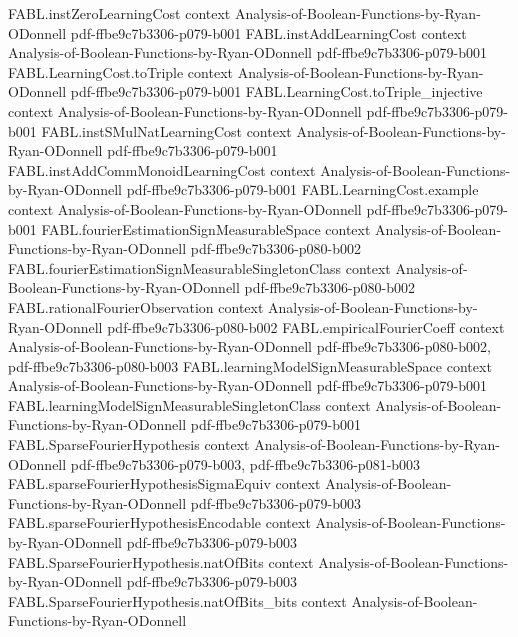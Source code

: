 \begin{theorem}
  {FABL.instZeroLearningCost}
  {context}
  {Analysis-of-Boolean-Functions-by-Ryan-ODonnell}
  {pdf-ffbe9c7b3306-p079-b001}
\proofstep
  {FABL.instAddLearningCost}
  {context}
  {Analysis-of-Boolean-Functions-by-Ryan-ODonnell}
  {pdf-ffbe9c7b3306-p079-b001}
\proofstep
  {FABL.LearningCost.toTriple}
  {context}
  {Analysis-of-Boolean-Functions-by-Ryan-ODonnell}
  {pdf-ffbe9c7b3306-p079-b001}
\proofstep
  {FABL.LearningCost.toTriple_injective}
  {context}
  {Analysis-of-Boolean-Functions-by-Ryan-ODonnell}
  {pdf-ffbe9c7b3306-p079-b001}
\proofstep
  {FABL.instSMulNatLearningCost}
  {context}
  {Analysis-of-Boolean-Functions-by-Ryan-ODonnell}
  {pdf-ffbe9c7b3306-p079-b001}
\proofstep
  {FABL.instAddCommMonoidLearningCost}
  {context}
  {Analysis-of-Boolean-Functions-by-Ryan-ODonnell}
  {pdf-ffbe9c7b3306-p079-b001}
\proofstep
  {FABL.LearningCost.example}
  {context}
  {Analysis-of-Boolean-Functions-by-Ryan-ODonnell}
  {pdf-ffbe9c7b3306-p079-b001}
\proofstep
  {FABL.fourierEstimationSignMeasurableSpace}
  {context}
  {Analysis-of-Boolean-Functions-by-Ryan-ODonnell}
  {pdf-ffbe9c7b3306-p080-b002}
\proofstep
  {FABL.fourierEstimationSignMeasurableSingletonClass}
  {context}
  {Analysis-of-Boolean-Functions-by-Ryan-ODonnell}
  {pdf-ffbe9c7b3306-p080-b002}
\proofstep
  {FABL.rationalFourierObservation}
  {context}
  {Analysis-of-Boolean-Functions-by-Ryan-ODonnell}
  {pdf-ffbe9c7b3306-p080-b002}
\proofstep
  {FABL.empiricalFourierCoeff}
  {context}
  {Analysis-of-Boolean-Functions-by-Ryan-ODonnell}
  {pdf-ffbe9c7b3306-p080-b002,
    pdf-ffbe9c7b3306-p080-b003}
\proofstep
  {FABL.learningModelSignMeasurableSpace}
  {context}
  {Analysis-of-Boolean-Functions-by-Ryan-ODonnell}
  {pdf-ffbe9c7b3306-p079-b001}
\proofstep
  {FABL.learningModelSignMeasurableSingletonClass}
  {context}
  {Analysis-of-Boolean-Functions-by-Ryan-ODonnell}
  {pdf-ffbe9c7b3306-p079-b001}
\proofstep
  {FABL.SparseFourierHypothesis}
  {context}
  {Analysis-of-Boolean-Functions-by-Ryan-ODonnell}
  {pdf-ffbe9c7b3306-p079-b003,
    pdf-ffbe9c7b3306-p081-b003}
\proofstep
  {FABL.sparseFourierHypothesisSigmaEquiv}
  {context}
  {Analysis-of-Boolean-Functions-by-Ryan-ODonnell}
  {pdf-ffbe9c7b3306-p079-b003}
\proofstep
  {FABL.sparseFourierHypothesisEncodable}
  {context}
  {Analysis-of-Boolean-Functions-by-Ryan-ODonnell}
  {pdf-ffbe9c7b3306-p079-b003}
\proofstep
  {FABL.SparseFourierHypothesis.natOfBits}
  {context}
  {Analysis-of-Boolean-Functions-by-Ryan-ODonnell}
  {pdf-ffbe9c7b3306-p079-b003}
\proofstep
  {FABL.SparseFourierHypothesis.natOfBits_bits}
  {context}
  {Analysis-of-Boolean-Functions-by-Ryan-ODonnell}

\end{theorem}
